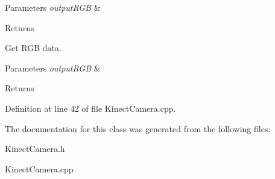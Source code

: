 \begin{DoxyParams}{Parameters}
{\em outputRGB} & \\
\hline
\end{DoxyParams}
\begin{DoxyReturn}{Returns}

\end{DoxyReturn}
Get RGB data.


\begin{DoxyParams}{Parameters}
{\em outputRGB} & \\
\hline
\end{DoxyParams}
\begin{DoxyReturn}{Returns}

\end{DoxyReturn}


Definition at line 42 of file KinectCamera.cpp.



The documentation for this class was generated from the following files:\begin{DoxyCompactItemize}
\item 
KinectCamera.h\item 
KinectCamera.cpp\end{DoxyCompactItemize}
